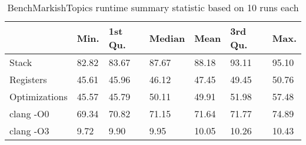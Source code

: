 \begin{table}[h!]
\centering
\begin{tabular}{p{}p{}p{}p{}p{}p{}p{}}
  \hline
 & Min. & 1st Qu. & Median & Mean & 3rd Qu. & Max. \\ 
  \hline
Stack & 82.82 & 83.67 & 87.67 & 88.18 & 93.11 & 95.10 \\ 
  Registers & 45.61 & 45.96 & 46.12 & 47.45 & 49.45 & 50.76 \\ 
  Optimizations & 45.57 & 45.79 & 50.11 & 49.91 & 51.98 & 57.48 \\ 
  clang -O0 & 69.34 & 70.82 & 71.15 & 71.64 & 71.77 & 74.89 \\ 
  clang -O3 & 9.72 & 9.90 & 9.95 & 10.05 & 10.26 & 10.43 \\ 
   \hline
\end{tabular}
\caption{BenchMarkishTopics runtime summary statistic based on 10 runs each}
\end{table}
